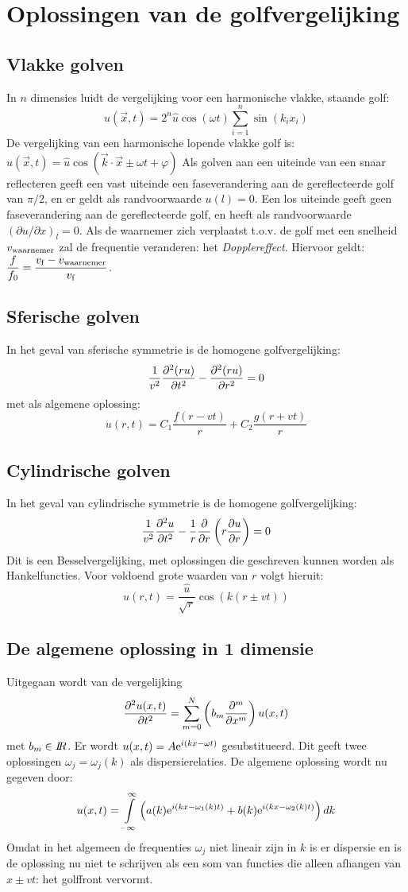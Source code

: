\section{Oplossingen van de golfvergelijking}
\subsection{Vlakke golven}
In $n$ dimensies luidt de vergelijking voor een harmonische vlakke, staande
golf:
\[
u(\vec{x},t)=2^n\hat{u}\cos(\omega t)\sum_{i=1}^n\sin(k_ix_i)
\]
De vergelijking van een harmonische lopende vlakke golf is:
$u(\vec{x},t)=\hat{u}\cos(\vec{k}\cdot\vec{x}\pm\omega t+\varphi)$
\npar
Als golven aan een uiteinde van een snaar reflecteren geeft een vast uiteinde
een faseverandering aan de gereflecteerde golf van $\pi/2$, en er geldt als
randvoorwaarde $u(l)=0$. Een los uiteinde geeft geen faseverandering aan de
gereflecteerde golf, en heeft als randvoorwaarde $(\partial u/\partial x)_l=0$.
\npar
Als de waarnemer zich verplaatst t.o.v. de golf met een snelheid $v_{\rm waarnemer}$
zal de frequentie veranderen: het {\it Dopplereffect}. Hiervoor geldt:
$\displaystyle\frac{f}{f_0}=\frac{v_{\rm f}-v_{\rm waarnemer}}{v_{\rm f}}$.

\subsection{Sferische golven}
In het geval van sferische symmetrie is de homogene golfvergelijking:
\[
\frac{1}{v^2}\frac{\partial^2 (ru)}{\partial t^2}-\frac{\partial^2 (ru)}{\partial r^2}=0
\]
met als algemene oplossing:
\[
u(r,t)=C_1\frac{f(r-vt)}{r}+C_2\frac{g(r+vt)}{r}
\]
\subsection{Cylindrische golven}
In het geval van cylindrische symmetrie is de homogene  golfvergelijking:
\[
\frac{1}{v^2}\frac{\partial^2 u}{\partial t^2}-\frac{1}{r}\frac{\partial }{\partial r}\left(r\frac{\partial u}{\partial r}\right)=0
\]
Dit is een Besselvergelijking, met oplossingen die geschreven kunnen worden
als Hankelfuncties. Voor voldoend grote waarden van $r$ volgt hieruit:
\[
u(r,t)=\frac{\hat{u}}{\sqrt{r}}\cos(k(r\pm vt))
\]
\subsection{De algemene oplossing in 1 dimensie}
Uitgegaan wordt van de vergelijking
\[
\frac{\partial^2 u(x,t)}{\partial t^2}=\sum_{m=0}^{N}\left(b_m\frac{\partial ^m}{\partial x^m}\right)u(x,t)
\]
met $b_m\in I\hspace{-1mm}R$. Er wordt $u(x,t)=A{\rm e}^{i(kx-\omega t)}$ gesubstitueerd.
Dit geeft twee oplossingen $\omega_j=\omega_j(k)$ als dispersierelaties. De
algemene oplossing wordt nu gegeven door:
\[
u(x,t)=\int\limits_{-\infty}^{\infty}\left(a(k){\rm e}^{i(kx-\omega_1(k)t)}+
b(k){\rm e}^{i(kx-\omega_2(k)t)}\right)dk
\]
Omdat in het algemeen de frequenties $\omega_j$ niet lineair zijn in $k$ is er
dispersie en is de oplossing nu niet te schrijven als een som van functies die
alleen afhangen van $x\pm vt$: het golffront vervormt.

